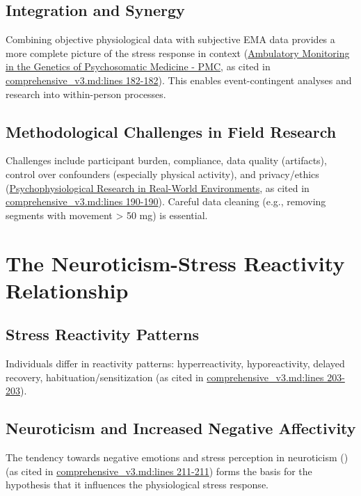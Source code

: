 \documentclass[11pt, a4paper]{report}
\newcommand{\pdfcite}[2]{\cite{#1} (\href{run:./papers/#2.pdf}{\texttt{\detokenize{#2.pdf}}})}
\newcommand{\mdcite}[3]{\href{run:./sources/#1}{\url{#1}:lines #2-#3}} %
\begin{document}
\subsection{Integration and Synergy}
\label{subsec:integration_ema_ambulatory}
Combining objective physiological data with subjective EMA data provides a more complete picture of the stress response in context (\href{https://pmc.ncbi.nlm.nih.gov/articles/PMC4564065/}{Ambulatory Monitoring in the Genetics of Psychosomatic Medicine - PMC}, as cited in \mdcite{comprehensive_v3.md}{182}{182}). This enables event-contingent analyses and research into within-person processes.

\subsection{Methodological Challenges in Field Research}
\label{subsec:challenges_field} %
Challenges include participant burden, compliance, data quality (artifacts), control over confounders (especially physical activity), and privacy/ethics (\href{https://www.frontiersin.org/journals/psychology/articles/10.3389/fpsyg.2025.1432180/full}{Psychophysiological Research in Real-World Environments}, as cited in \mdcite{comprehensive_v3.md}{190}{190}). Careful data cleaning (e.g., removing segments with movement > 50 mg) is essential.

\section{The Neuroticism-Stress Reactivity Relationship}
\label{sec:neuroticism_reactivity}

\subsection{Stress Reactivity Patterns}
\label{subsec:reactivity_patterns}
Individuals differ in reactivity patterns: hyperreactivity, hyporeactivity, delayed recovery, habituation/sensitization \cite{KrantzManuck1984} (as cited in \mdcite{comprehensive_v3.md}{203}{203}).

\subsection{Neuroticism and Increased Negative Affectivity}
\label{subsec:neuroticism_affectivity}
The tendency towards negative emotions and stress perception in neuroticism \pdfcite{Barlow_OriginsNeuroticism}{The_origins_of_neuroticism} (as cited in \mdcite{comprehensive_v3.md}{211}{211}) forms the basis for the hypothesis that it influences the physiological stress response.
\end{document}

